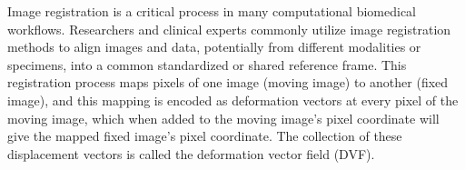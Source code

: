 \documentclass[lettersize,journal]{IEEEtran}
\begin{document}
Image registration is a critical process in many computational biomedical workflows. Researchers and clinical experts commonly utilize image registration methods to align images and data, potentially from different modalities or specimens, into a common standardized or shared reference frame. This registration process maps pixels of one image (moving image) to another (fixed image), and this mapping is encoded as deformation vectors at every pixel of the moving image, which when added to the moving image's pixel coordinate will give the mapped fixed image's pixel coordinate. The collection of these displacement vectors is called the deformation vector field (DVF).

\end{document}
